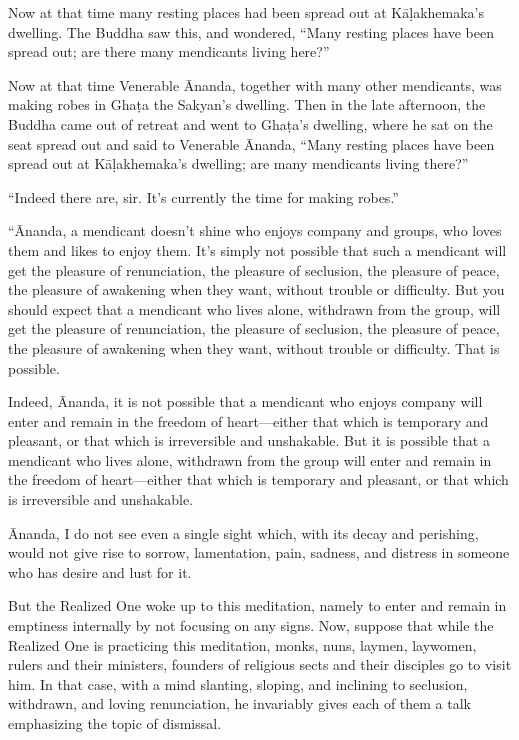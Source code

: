 \documentclass[12pt,openany]{book}%
\begin{document}
Now at that time many resting places had been spread out at Kā\textsanskrit{ḷakhemaka}’s dwelling. The Buddha saw this, and wondered, “Many resting places have been spread out; are there many mendicants living here?” 

Now at that time Venerable Ānanda, together with many other mendicants, was making robes in \textsanskrit{Ghaṭa} the Sakyan’s dwelling. Then in the late afternoon, the Buddha came out of retreat and went to \textsanskrit{Ghaṭa}’s dwelling, where he sat on the seat spread out and said to Venerable Ānanda, “Many resting places have been spread out at \textsanskrit{Kāḷakhemaka}’s dwelling; are many mendicants living there?” 

“Indeed there are, sir. It’s currently the time for making robes.” 

“Ānanda, a mendicant doesn’t shine who enjoys company and groups, who loves them and likes to enjoy them. It’s simply not possible that such a mendicant will get the pleasure of renunciation, the pleasure of seclusion, the pleasure of peace, the pleasure of awakening when they want, without trouble or difficulty. But you should expect that a mendicant who lives alone, withdrawn from the group, will get the pleasure of renunciation, the pleasure of seclusion, the pleasure of peace, the pleasure of awakening when they want, without trouble or difficulty. That is possible. 

Indeed, Ānanda, it is not possible that a mendicant who enjoys company will enter and remain in the freedom of heart—either that which is temporary and pleasant, or that which is irreversible and unshakable. But it is possible that a mendicant who lives alone, withdrawn from the group will enter and remain in the freedom of heart—either that which is temporary and pleasant, or that which is irreversible and unshakable. 

Ānanda, I do not see even a single sight which, with its decay and perishing, would not give rise to sorrow, lamentation, pain, sadness, and distress in someone who has desire and lust for it. 

But the Realized One woke up to this meditation, namely to enter and remain in emptiness internally by not focusing on any signs. Now, suppose that while the Realized One is practicing this meditation, monks, nuns, laymen, laywomen, rulers and their ministers, founders of religious sects and their disciples go to visit him. In that case, with a mind slanting, sloping, and inclining to seclusion, withdrawn, and loving renunciation, he invariably gives each of them a talk emphasizing the topic of dismissal. 
\end{document}
